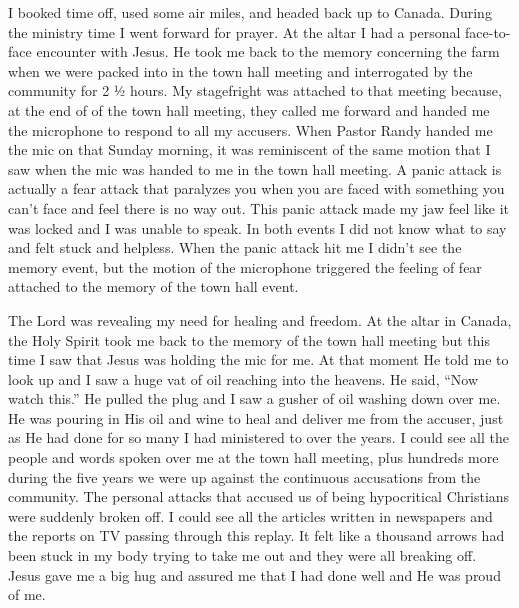 \documentclass[oneside]{book}
\begin{document}
I booked time off, used some air miles, and headed back up to Canada. During the ministry time I went forward for prayer. At the altar I had a personal face-to-face encounter with Jesus. He took me back to the memory concerning the farm when we were packed into in the town hall meeting and interrogated by the community for 2 ½ hours. My stagefright was attached to that meeting because, at the end of of the town hall meeting, they called me forward and handed me the microphone to respond to all my accusers. When Pastor Randy handed me the mic on that Sunday morning, it was reminiscent of the same motion that I saw when the mic was handed to me in the town hall meeting. A panic attack is actually a fear attack that paralyzes you when you are faced with something you can’t face and feel there is no way out. This panic attack made my jaw feel like it was locked and I was unable to speak. In both events I did not know what to say and felt stuck and helpless. When the panic attack hit me I didn’t see the memory event, but the motion of the microphone triggered the feeling of fear attached to the memory of the town hall event. 

The Lord was revealing my need for healing and freedom. At the altar in Canada, the Holy Spirit took me back to the memory of the town hall meeting but this time I saw that Jesus was holding the mic for me. At that moment He told me to look up and I saw a huge vat of oil reaching into the heavens. He said, “Now watch this.” He pulled the plug and I saw a gusher of oil washing down over me. He was pouring in His oil and wine to heal and deliver me from the accuser, just as He had done for so many I had ministered to over the years. I could see all the people and words spoken over me at the town hall meeting, plus hundreds more during the five years we were up against the continuous accusations from the community. The personal attacks that accused us of being hypocritical Christians were suddenly broken off. I could see all the articles written in newspapers and the reports on TV passing through this replay. It felt like a thousand arrows had been stuck in my body trying to take me out and they were all breaking off. Jesus gave me a big hug and assured me that I had done well and He was proud of me. 
\end{document}
